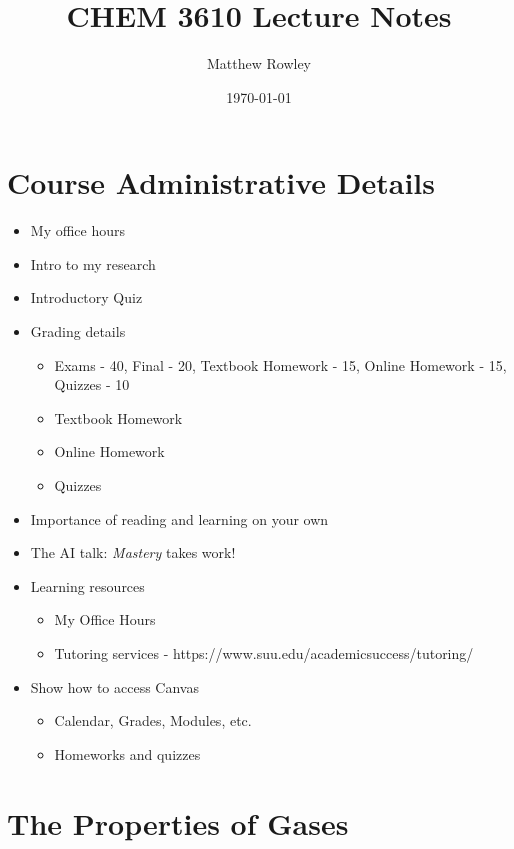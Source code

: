 \documentclass[12pt, openany, letterpaper]{memoir}
\begin{document}
\title{CHEM 3610 Lecture Notes}
\author{Matthew Rowley}
\date{\today}
\mainmatter
\maketitle

\chapter*{Course Administrative Details}
\begin{itemize}
	\item My office hours
	\item Intro to my research
	\item Introductory Quiz
	\item Grading details
	      \begin{itemize}
		      \item Exams - 40, Final - 20, Textbook Homework - 15, Online Homework - 15, Quizzes - 10
		      \item Textbook Homework
          \item Online Homework
		      \item Quizzes
	      \end{itemize}
	\item Importance of reading and learning on your own
  \item The AI talk: \emph{Mastery} takes work!
	\item Learning resources
	      \begin{itemize}
		      \item My Office Hours
		      \item Tutoring services - https://www.suu.edu/academicsuccess/tutoring/
	      \end{itemize}
	\item Show how to access Canvas
	      \begin{itemize}
		      \item Calendar, Grades, Modules, etc.
		      \item Homeworks and quizzes
	      \end{itemize}
\end{itemize}


\chapter{The Properties of Gases}
\end{document}
